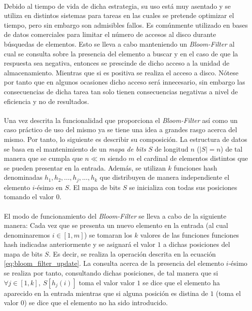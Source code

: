 \documentclass{subfiles}
\begin{document}
      \paragraph{}
      Debido al tiempo de vida de dicha estrategia, su uso está muy asentado y se utiliza en distintos sistemas para tareas en las cuales se pretende optimizar el tiempo, pero sin embargo son admisibles fallos. Es comúnmente utilizado en bases de datos comerciales para limitar el número de accesos al disco durante búsquedas de elementos. Esto se lleva a cabo manteniendo un \emph{Bloom-Filter} al cual se consulta sobre la presencia del elemento a buscar y en el caso de que la respuesta sea negativa, entonces se prescinde de dicho acceso a la unidad de almacenamiento. Mientras que si es positiva se realiza el acceso a disco. Nótese por tanto que en algunos ocasiones dicho acceso será innecesario, sin embargo las consecuencias de dicha tarea tan solo tienen consecuencias negativas a nivel de eficiencia y no de resultados.

      \paragraph{}
      Una vez descrita la funcionalidad que proporciona el \emph{Bloom-Filter} así como un caso práctico de uso del mismo ya se tiene una idea a grandes rasgo acerca del mismo. Por tanto, lo siguiente es describir su composición. La estructura de datos se basa en el mantenimiento de un \emph{mapa de bits} $S$ de longitud $n$ ($|S| = n$) de tal manera que se cumpla que $n \ll m$ siendo $m$ el cardinal de elementos distintos que se pueden presentar en la entrada. Además, se utilizan $k$ funciones hash denominadas $h_1, h_2,..., h_j,..., h_k$ que distribuyen de manera independiente el elemento $i$-ésimo en $S$. El mapa de bits $S$ se inicializa con todas sus posiciones tomando el valor $0$.

      \paragraph{}
      El modo de funcionamiento del \emph{Bloom-Filter} se lleva a cabo de la siguiente manera: Cada vez que se presenta un nuevo elemento en la entrada (al cual denominaremos $i \in [1, m]$) se tomaran los $k$ valores de las funciones funciones hash indicadas anteriormente y se asignará el valor $1$ a dichas posiciones del mapa de bits $S$. Es decir, se realiza la operación descrita en la ecuación \eqref{eq:bloom_filter_update}. La consulta acerca de la presencia del elemento $i$-ésimo se realiza por tanto, consultando dichas posiciones, de tal manera que si $\forall j \in [1,k], \ S[h_j(i)]$ toma el valor valor $1$ se dice que el elemento ha aparecido en la entrada mientras que si alguna posición es distina de $1$ (toma el valor $0$) se dice que el elemento no ha sido introducido.
\end{document}
